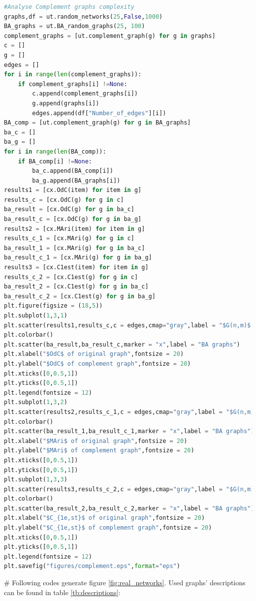 \documentclass[12pt]{article}
\begin{document}
\begin{lstlisting}[breaklines=true,language=Python]
#Analyse Complement graphs complexity
graphs,df = ut.random_networks(25,False,1000)
BA_graphs = ut.BA_random_graphs(25, 100)
complement_graphs = [ut.complement_graph(g) for g in graphs]
c = []
g = []
edges = []
for i in range(len(complement_graphs)):
    if complement_graphs[i] !=None:
        c.append(complement_graphs[i])
        g.append(graphs[i])
        edges.append(df["Number_of_edges"][i])
BA_comp = [ut.complement_graph(g) for g in BA_graphs]
ba_c = []
ba_g = []
for i in range(len(BA_comp)):
    if BA_comp[i] !=None:
        ba_c.append(BA_comp[i])
        ba_g.append(BA_graphs[i])
results1 = [cx.OdC(item) for item in g]
results_c = [cx.OdC(g) for g in c]
ba_result = [cx.OdC(g) for g in ba_c]
ba_result_c = [cx.OdC(g) for g in ba_g]
results2 = [cx.MAri(item) for item in g]
results_c_1 = [cx.MAri(g) for g in c]
ba_result_1 = [cx.MAri(g) for g in ba_c]
ba_result_c_1 = [cx.MAri(g) for g in ba_g]
results3 = [cx.C1est(item) for item in g]
results_c_2 = [cx.C1est(g) for g in c]
ba_result_2 = [cx.C1est(g) for g in ba_c]
ba_result_c_2 = [cx.C1est(g) for g in ba_g]
plt.figure(figsize = (18,5))
plt.subplot(1,3,1)
plt.scatter(results1,results_c,c = edges,cmap="gray",label = "$G(n,m)$ random graphs")
plt.colorbar()
plt.scatter(ba_result,ba_result_c,marker = "x",label = "BA graphs")
plt.xlabel("$OdC$ of original graph",fontsize = 20)
plt.ylabel("$OdC$ of complement graph",fontsize = 20)
plt.xticks([0,0.5,1])
plt.yticks([0,0.5,1])
plt.legend(fontsize = 12)
plt.subplot(1,3,2)
plt.scatter(results2,results_c_1,c = edges,cmap="gray",label = "$G(n,m)$ random graphs")
plt.colorbar()
plt.scatter(ba_result_1,ba_result_c_1,marker = "x",label = "BA graphs")
plt.xlabel("$MAri$ of original graph",fontsize = 20)
plt.ylabel("$MAri$ of complement graph",fontsize = 20)
plt.xticks([0,0.5,1])
plt.yticks([0,0.5,1])
plt.subplot(1,3,3)
plt.scatter(results3,results_c_2,c = edges,cmap="gray",label = "$G(n,m)$ random graphs")
plt.colorbar()
plt.scatter(ba_result_2,ba_result_c_2,marker = "x",label = "BA graphs")
plt.xlabel("$C_{1e,st}$ of original graph",fontsize = 20)
plt.ylabel("$C_{1e,st}$ of complement graph",fontsize = 20)
plt.xticks([0,0.5,1])
plt.yticks([0,0.5,1])
plt.legend(fontsize = 12)
plt.savefig("figures/complement.eps",format="eps")
\end{lstlisting}
\noindent
\newline
\# Following codes generate figure \ref{fig:real_networks}. Used graphs' descriptions can be found in table \ref{tb:descriptions}:
\end{document}
